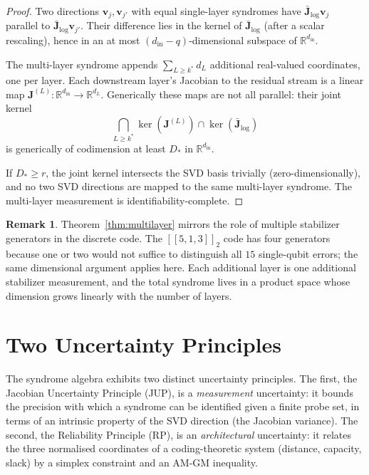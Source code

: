 \documentclass[11pt,a4paper]{article}
\theoremstyle{definition}
\newtheorem{remark}[theorem]{Remark}
\newcommand{\Jm}{\mathbf{J}}
\newcommand{\vk}[1][]{\mathbf{v}_{#1}}
\newcommand{\Rbb}{\mathbb{R}}
\newcommand{\dimin}{d_{\mathrm{in}}}
\begin{document}
\begin{proof}
Two directions $\vk[j],\vk[j']$ with equal single-layer syndromes have $\bar{\Jm}_{\mathrm{log}}\vk[j]$ parallel to $\bar{\Jm}_{\mathrm{log}}\vk[j']$. Their difference lies in the kernel of $\bar{\Jm}_{\mathrm{log}}$ (after a scalar rescaling), hence in an at most $(\dimin - q)$-dimensional subspace of $\Rbb^{\dimin}$.

The multi-layer syndrome appends $\sum_{L\geq k^*} d_L$ additional real-valued coordinates, one per layer. Each downstream layer's Jacobian to the residual stream is a linear map $\Jm^{(L)}: \Rbb^{\dimin} \to \Rbb^{d_L}$. Generically these maps are not all parallel: their joint kernel
\[
  \bigcap_{L\geq k^*}\ker(\Jm^{(L)}) \cap \ker(\bar{\Jm}_{\mathrm{log}})
\]
is generically of codimension at least $D_*$ in $\Rbb^{\dimin}$.

If $D_* \geq r$, the joint kernel intersects the SVD basis trivially (zero-dimensionally), and no two SVD directions are mapped to the same multi-layer syndrome. The multi-layer measurement is identifiability-complete.
\end{proof}

\begin{remark}
Theorem~\ref{thm:multilayer} mirrors the role of multiple stabilizer generators in the discrete code. The $[\![5,1,3]\!]_2$ code has four generators because one or two would not suffice to distinguish all $15$ single-qubit errors; the same dimensional argument applies here. Each additional layer is one additional stabilizer measurement, and the total syndrome lives in a product space whose dimension grows linearly with the number of layers.
\end{remark}

\section{Two Uncertainty Principles}
\label{sec:up}

The syndrome algebra exhibits two distinct uncertainty principles. The first, the Jacobian Uncertainty Principle (JUP), is a \emph{measurement} uncertainty: it bounds the precision with which a syndrome can be identified given a finite probe set, in terms of an intrinsic property of the SVD direction (the Jacobian variance). The second, the Reliability Principle (RP), is an \emph{architectural} uncertainty: it relates the three normalised coordinates of a coding-theoretic system (distance, capacity, slack) by a simplex constraint and an AM-GM inequality.
\end{document}
